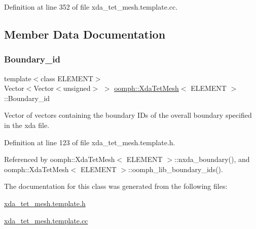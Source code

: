 Definition at line 352 of file xda\+\_\+tet\+\_\+mesh.\+template.\+cc.



\subsection{Member Data Documentation}
\mbox{\label{classoomph_1_1XdaTetMesh_a1774abc96e730c89e95b99933a7c0ae3}} 
\subsubsection{\texorpdfstring{Boundary\+\_\+id}{Boundary\_id}}
{\footnotesize\ttfamily template$<$class E\+L\+E\+M\+E\+NT$>$ \\
Vector$<$Vector$<$unsigned$>$ $>$ \hyperlink{classoomph_1_1XdaTetMesh}{oomph\+::\+Xda\+Tet\+Mesh}$<$ E\+L\+E\+M\+E\+NT $>$\+::Boundary\+\_\+id\hspace{0.3cm}{\ttfamily [private]}}



Vector of vectors containing the boundary I\+Ds of the overall boundary specified in the xda file. 



Definition at line 123 of file xda\+\_\+tet\+\_\+mesh.\+template.\+h.



Referenced by oomph\+::\+Xda\+Tet\+Mesh$<$ E\+L\+E\+M\+E\+N\+T $>$\+::nxda\+\_\+boundary(), and oomph\+::\+Xda\+Tet\+Mesh$<$ E\+L\+E\+M\+E\+N\+T $>$\+::oomph\+\_\+lib\+\_\+boundary\+\_\+ids().



The documentation for this class was generated from the following files\+:\begin{DoxyCompactItemize}
\item 
\hyperlink{xda__tet__mesh_8template_8h}{xda\+\_\+tet\+\_\+mesh.\+template.\+h}\item 
\hyperlink{xda__tet__mesh_8template_8cc}{xda\+\_\+tet\+\_\+mesh.\+template.\+cc}\end{DoxyCompactItemize}
